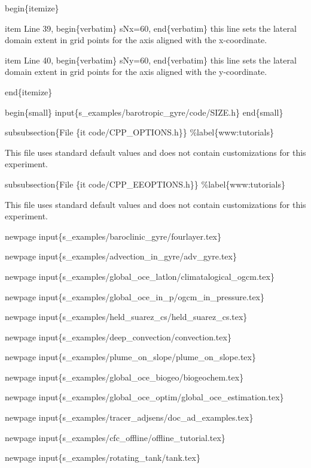 \documentclass[letterpaper,10pt,english]{sphinxmanual}
\begin{document}
begin\{itemize\}

item Line 39,
begin\{verbatim\} sNx=60, end\{verbatim\} this line sets
the lateral domain extent in grid points for the
axis aligned with the x-coordinate.

item Line 40,
begin\{verbatim\} sNy=60, end\{verbatim\} this line sets
the lateral domain extent in grid points for the
axis aligned with the y-coordinate.

end\{itemize\}

begin\{small\}
input\{s\_examples/barotropic\_gyre/code/SIZE.h\}
end\{small\}

subsubsection\{File \{it code/CPP\_OPTIONS.h\}\}
\%label\{www:tutorials\}

This file uses standard default values and does not contain
customizations for this experiment.

subsubsection\{File \{it code/CPP\_EEOPTIONS.h\}\}
\%label\{www:tutorials\}

This file uses standard default values and does not contain
customizations for this experiment.

newpage
input\{s\_examples/baroclinic\_gyre/fourlayer.tex\}

newpage
input\{s\_examples/advection\_in\_gyre/adv\_gyre.tex\}

newpage
input\{s\_examples/global\_oce\_latlon/climatalogical\_ogcm.tex\}

newpage
input\{s\_examples/global\_oce\_in\_p/ogcm\_in\_pressure.tex\}

newpage
input\{s\_examples/held\_suarez\_cs/held\_suarez\_cs.tex\}

newpage
input\{s\_examples/deep\_convection/convection.tex\}

newpage
input\{s\_examples/plume\_on\_slope/plume\_on\_slope.tex\}

newpage
input\{s\_examples/global\_oce\_biogeo/biogeochem.tex\}

newpage
input\{s\_examples/global\_oce\_optim/global\_oce\_estimation.tex\}

newpage
input\{s\_examples/tracer\_adjsens/doc\_ad\_examples.tex\}

newpage
input\{s\_examples/cfc\_offline/offline\_tutorial.tex\}

newpage
input\{s\_examples/rotating\_tank/tank.tex\}
\label{\detokenize{zreferences:references}}
\end{document}
